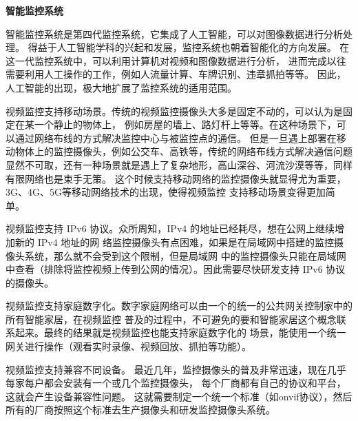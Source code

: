 \noindent \textbf{智能监控系统}

智能监控系统是第四代监控系统，它集成了人工智能，可以对图像数据进行分析处理。
得益于人工智能学科的兴起和发展，监控系统也朝着智能化的方向发展\cite{邵爱菊2015智能视频监控系统}。
在这一代监控系统中，可以利用计算机对视频和图像数据进行分析，
进而完成以往需要利用人工操作的工作，例如人流量计算、车牌识别、违章抓拍等等。
因此，人工智能的出现，极大地扩展了监控系统的适用范围。

视频监控支持移动场景。传统的视频监控摄像头大多是固定不动的，可以认为是固定在某一个静止的物体上，
例如房屋的墙上、路灯杆上等等。在这种场景下，可以通过网络布线的方式解决监控中心与被监控点的通信。
但是一旦遇上部署在移动物体上的监控摄像头，例如公交车、高铁等，传统的网络布线方式解决通信问题
显然不可取，还有一种场景就是遇上了复杂地形，高山深谷、河流沙漠等等，同样有限网络也是束手无策。
这个时候支持移动网络的监控摄像头就显得尤为重要，3G、4G、5G等移动网络技术的出现，使得视频监控
支持移动场景变得更加简单\cite{雷俊智2008移动视频监控技术应用研究}。

视频监控支持 IPv6 协议。众所周知，IPv4 的地址已经耗尽，想在公网上继续增加新的 IPv4 地址的网
络监控摄像头有点困难，如果是在局域网中搭建的监控摄像头系统，那么就不会受到这个限制，但是局域网
中的监控摄像头只能在局域网中查看（排除将监控视频上传到公网的情况）。因此需要尽快研发支持 IPv6
协议的摄像头。

视频监控支持家庭数字化。数字家庭网络可以由一个的统一的公共网关控制家中的所有智能家居，在视频监控
普及的过程中，不可避免的要和智能家居这个概念联系起来。最终的结果就是视频监控也能支持家庭数字化的
场景，能使用一个统一网关进行操作（观看实时录像、视频回放、抓拍等功能）\cite{丁瑞云2017家庭监控系统的发展}。

视频监控支持兼容不同设备。
最近几年，监控摄像头的普及非常迅速，现在几乎每家每户都会安装有一个或几个监控摄像头，
每个厂商都有自己的协议和平台，这就会产生设备兼容性问题。
这就需要制定一个统一个标准（如onvif协议\cite{陈少尉2014基于}），然后所有的厂商按照这个标准去生产摄像头和研发监控摄像头系统。

